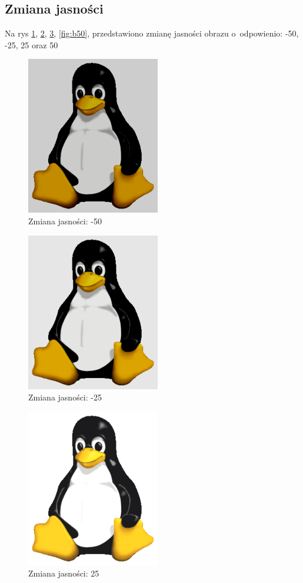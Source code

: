 \documentclass[a4paper, 12pt]{article}
\begin{document}
\subsection{Zmiana jasności}
Na rys \ref{fig:b-50}, \ref{fig:b-25}, \ref{fig:b25}, \ref{fig:b50}, przedstawiono zmianę jasności obrazu o~odpowienio: -50, -25, 25 oraz 50
\begin{figure}[p]
\includegraphics{b-50}
\caption{Zmiana jasności: -50}
\label{fig:b-50}
\end{figure}
\begin{figure}[p]
\includegraphics{b-25}
\caption{Zmiana jasności: -25}
\label{fig:b-25}
\end{figure}
\begin{figure}[p]
\includegraphics{b25}
\caption{Zmiana jasności: 25}
\label{fig:b25}
\end{figure}
\end{document}
